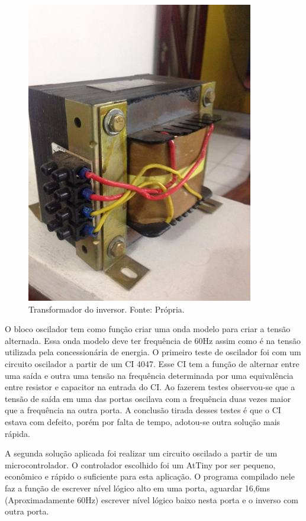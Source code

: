         \begin{figure}[!htb]
            \centering
            \includegraphics[scale= 0.3]{figuras/Transformador_Inversor.jpg}
            \caption{Transformador do inversor. Fonte: Própria.}
            \label{transformador-inversor}
        \end{figure}  

        O bloco oscilador tem como função criar uma onda modelo para criar a tensão 					alternada. Essa onda modelo deve ter frequência de 60Hz assim como é na tensão 				utilizada pela concessionária de energia. O primeiro teste de oscilador foi 					com um circuito oscilador a partir de um CI 4047. Esse CI tem a função de 						alternar entre uma saída e outra uma tensão na frequência determinada por uma 					equivalência entre resistor e capacitor na entrada do CI. Ao fazerem testes 					observou-se que a tensão de saída em uma das portas oscilava com a frequência 					duas vezes maior que a frequência na outra porta. A conclusão tirada desses 					testes é que o CI estava com defeito, porém por falta de tempo, adotou-se 						outra solução mais rápida.
        
        A segunda solução aplicada foi realizar um circuito oscilado a partir de um 					microcontrolador. O controlador escolhido foi um AtTiny por ser pequeno, 						econômico e rápido o suficiente para esta aplicação. O programa compilado nele 				faz a função de escrever nível lógico alto em uma porta, aguardar 16,6ms 						(Aproximadamente 60Hz) escrever nível lógico baixo nesta porta e o inverso com 				outra porta. 	

